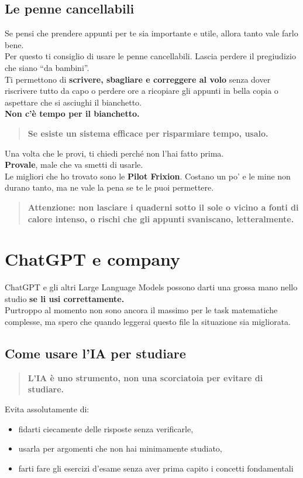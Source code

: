 \documentclass[18pt]{extarticle}
\begin{document}
\subsection{Le penne cancellabili}
Se pensi che prendere appunti per te sia importante e utile, allora tanto vale farlo bene.\\
Per questo ti consiglio di usare le penne cancellabili. Lascia perdere il pregiudizio che siano ``da bambini''.\\
Ti permettono di \textbf{scrivere, sbagliare e correggere al volo} senza dover riscrivere tutto da capo o perdere ore a ricopiare gli appunti in bella copia o aspettare che si asciughi il bianchetto.\\
\textbf{Non c'è tempo per il bianchetto.}
\begin{quote}
\textbf{Se esiste un sistema efficace per risparmiare tempo, usalo.}
\end{quote}
Una volta che le provi, ti chiedi perché non l'hai fatto prima.\\
\textbf{Provale}, male che va smetti di usarle.\\
Le migliori che ho trovato sono le \textbf{Pilot Frixion}. Costano un po' e le mine non durano tanto, ma ne vale la pena se te le puoi permettere.
\begin{quote}
\textbf{Attenzione: non lasciare i quaderni sotto il sole o vicino a fonti di calore intenso, o rischi che gli appunti svaniscano, letteralmente.}
\end{quote}


\section{ChatGPT e company}
ChatGPT e gli altri Large Language Models possono darti una grossa mano nello studio \textbf{se li usi correttamente.}\\
Purtroppo al momento non sono ancora il massimo per le task matematiche complesse, ma spero che quando leggerai questo file la situazione sia migliorata.


\subsection{Come usare l'IA per studiare}
\begin{quote}
\textbf{L'IA è uno strumento, non una scorciatoia per evitare di studiare.}
\end{quote}
Evita assolutamente di:
\begin{itemize}
\item fidarti ciecamente delle risposte senza verificarle,
\item usarla per argomenti che non hai minimamente studiato,
\item farti fare gli esercizi d'esame senza aver prima capito i concetti fondamentali
\end{itemize}
\end{document}
